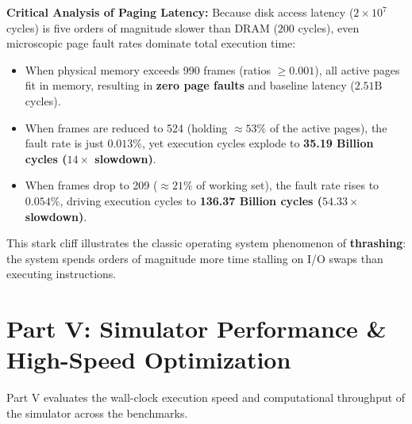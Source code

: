 \documentclass[11pt,a4paper]{article}
\begin{document}
\noindent\textbf{Critical Analysis of Paging Latency:}
Because disk access latency ($2 \times 10^7$ cycles) is five orders of magnitude slower than DRAM ($200$ cycles), even microscopic page fault rates dominate total execution time:
\begin{itemize}
    \item When physical memory exceeds 990 frames (ratios $\ge 0.001$), all active pages fit in memory, resulting in \textbf{zero page faults} and baseline latency ($2.51\text{B}$ cycles).
    \item When frames are reduced to 524 (holding $\approx 53\%$ of the active pages), the fault rate is just $0.013\%$, yet execution cycles explode to \textbf{35.19 Billion cycles ($14\times$ slowdown)}.
    \item When frames drop to 209 ($\approx 21\%$ of working set), the fault rate rises to $0.054\%$, driving execution cycles to \textbf{136.37 Billion cycles ($54.33\times$ slowdown)}.
\end{itemize}
This stark cliff illustrates the classic operating system phenomenon of \textbf{thrashing}: the system spends orders of magnitude more time stalling on I/O swaps than executing instructions.

\section{Part V: Simulator Performance \& High-Speed Optimization}

Part V evaluates the wall-clock execution speed and computational throughput of the simulator across the benchmarks.
\end{document}
